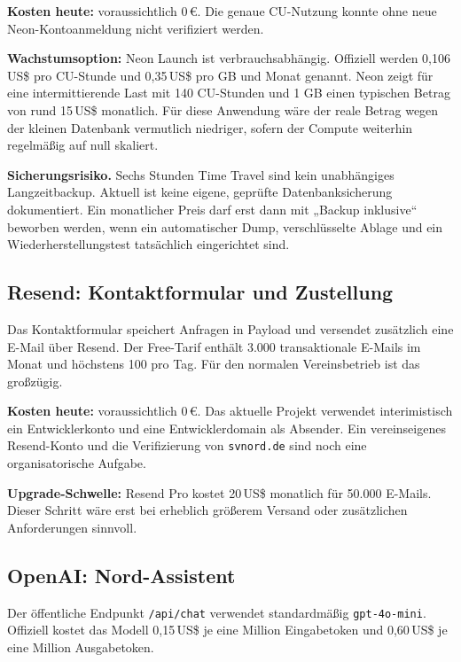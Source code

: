 \documentclass[11pt,a4paper]{article}
\newcommand{\eur}[1]{#1\,€}
\newcommand{\usd}[1]{#1\,US\$}
\begin{document}
\textbf{Kosten heute:} voraussichtlich \eur{0}. Die genaue CU-Nutzung konnte ohne neue Neon-Kontoanmeldung nicht verifiziert werden.

\textbf{Wachstumsoption:} Neon Launch ist verbrauchsabhängig. Offiziell werden \usd{0,106} pro CU-Stunde und \usd{0,35} pro GB und Monat genannt. Neon zeigt für eine intermittierende Last mit 140 CU-Stunden und 1 GB einen typischen Betrag von rund \usd{15} monatlich. Für diese Anwendung wäre der reale Betrag wegen der kleinen Datenbank vermutlich niedriger, sofern der Compute weiterhin regelmäßig auf null skaliert.

\begin{riskbox}
  \textbf{Sicherungsrisiko.} Sechs Stunden Time Travel sind kein unabhängiges Langzeitbackup. Aktuell ist keine eigene, geprüfte Datenbanksicherung dokumentiert. Ein monatlicher Preis darf erst dann mit „Backup inklusive“ beworben werden, wenn ein automatischer Dump, verschlüsselte Ablage und ein Wiederherstellungstest tatsächlich eingerichtet sind.
\end{riskbox}

\subsection{Resend: Kontaktformular und Zustellung}

Das Kontaktformular speichert Anfragen in Payload und versendet zusätzlich eine E-Mail über Resend. Der Free-Tarif enthält 3.000 transaktionale E-Mails im Monat und höchstens 100 pro Tag. Für den normalen Vereinsbetrieb ist das großzügig.

\textbf{Kosten heute:} voraussichtlich \eur{0}. Das aktuelle Projekt verwendet interimistisch ein Entwicklerkonto und eine Entwicklerdomain als Absender. Ein vereinseigenes Resend-Konto und die Verifizierung von \texttt{svnord.de} sind noch eine organisatorische Aufgabe.

\textbf{Upgrade-Schwelle:} Resend Pro kostet \usd{20} monatlich für 50.000 E-Mails. Dieser Schritt wäre erst bei erheblich größerem Versand oder zusätzlichen Anforderungen sinnvoll.

\subsection{OpenAI: Nord-Assistent}

Der öffentliche Endpunkt \texttt{/api/chat} verwendet standardmäßig \texttt{gpt-4o-mini}. Offiziell kostet das Modell \usd{0,15} je eine Million Eingabetoken und \usd{0,60} je eine Million Ausgabetoken.
\end{document}
